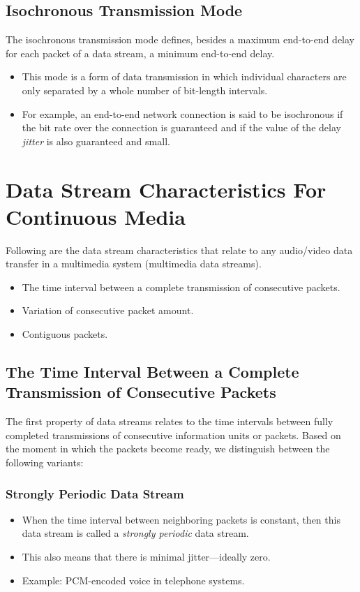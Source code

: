 \subsection{Isochronous Transmission Mode}
The isochronous transmission mode defines, besides a maximum end-to-end delay for each packet of a data stream, a minimum end-to-end delay.
\begin{itemize}
	\item This mode is a form of data transmission in which individual characters are only separated by a whole number of bit-length intervals. 
	\item For example, an end-to-end network connection is said to be isochronous if the bit rate over the connection is guaranteed and if the value of the delay \textit{jitter} is also guaranteed and small.
\end{itemize}

\section{Data Stream Characteristics For Continuous Media}
Following are the data stream characteristics that relate to any audio/video data transfer in a multimedia system (multimedia data streams).
\begin{itemize}
	\item The time interval between a complete transmission of consecutive packets.
	\item Variation of consecutive packet amount.
	\item Contiguous packets.
\end{itemize}

\subsection{The Time Interval Between a Complete Transmission of Consecutive Packets}
The first property of data streams relates to the time intervals between fully completed transmissions of consecutive information units or packets. Based on the moment
in which the packets become ready, we distinguish between the following variants:

\subsubsection{Strongly Periodic Data Stream}
\begin{itemize}
	\item When the time interval between neighboring packets is constant, then this data
	stream is called a \textit{strongly periodic} data stream.
	\item This also means that there is minimal jitter—ideally zero.
	\item Example: PCM-encoded voice in telephone systems.
\end{itemize}


